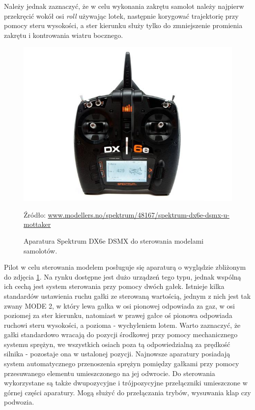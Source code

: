 \documentclass[12pt, a4paper]{article}
\begin{document}
Należy jednak zaznaczyć, że w celu wykonania zakrętu samolot należy najpierw przekręcić wokół osi \textit{roll} używając lotek, następnie korygować trajektorię przy pomocy steru wysokości, a ster kierunku służy tylko do zmniejszenie promienia zakrętu i kontrowania wiatru bocznego.

\begin{figure}[ht]
    \centering
    \includegraphics[width=1\textwidth]{dx6e}
    \caption{Aparatura Spektrum DX6e DSMX do sterowania modelami samolotów.}
    \small Źródło: \url{www.modellers.no/spektrum/48167/spektrum-dx6e-dsmx-u-mottaker}
    \label{fig:dx6e}
\end{figure}

Pilot w celu sterowania modelem posługuje się aparaturą o wyglądzie zbliżonym do zdjęcia \ref{fig:dx6e}. Na rynku dostępne jest dużo urządzeń tego typu, jednak wspólną ich cechą jest system sterowania przy pomocy dwóch gałek. Istnieje kilka standardów ustawienia ruchu gałki ze sterowaną wartością, jednym z nich jest tak zwany MODE 2, w który lewa gałka w osi pionowej odpowiada za gaz, w osi poziomej za ster kierunku, natomiast w prawej gałce oś pionowa odpowiada ruchowi steru wysokości, a pozioma - wychyleniem lotem. Warto zaznaczyć, że gałki standardowo wracają do pozycji środkowej przy pomocy mechanicznego systemu sprężyn, we wszystkich osiach poza tą odpowiedzialną za prędkość silnika - pozostaje ona w ustalonej pozycji. Najnowsze aparatury posiadają system automatycznego przenoszenia sprężyn pomiędzy gałkami przy pomocy przesuwanego elementu umieszczonego na jej odwrocie. Do sterowania wykorzystane są także dwupozycyjne i trójpozycyjne przełączniki umieszczone w górnej części aparatury. Mogą służyć do przełączania trybów, wysuwania klap czy podwozia.
\end{document}
